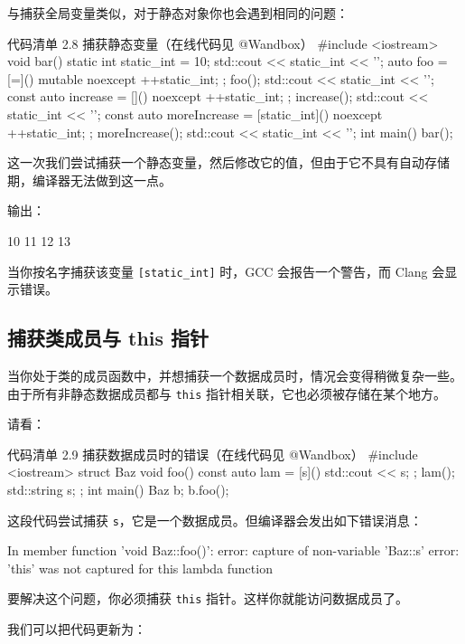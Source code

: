 \begin{codebox}
与捕获全局变量类似，对于静态对象你也会遇到相同的问题：

\begin{codeboxt}{代码清单 2.8 捕获静态变量（在线代码见 @Wandbox）}
#include <iostream>
void bar() {
static int static_int = 10;
std::cout << static_int << '\n';
auto foo = [=]() mutable noexcept{ ++static_int; };
foo();
std::cout << static_int << '\n';
const auto increase = []() noexcept { ++static_int; };
increase();
std::cout << static_int << '\n';
const auto moreIncrease = [static_int]() noexcept { ++static_int; };
moreIncrease();
std::cout << static_int << '\n';
}
int main() {
bar();
}
\end{codeboxt}

这一次我们尝试捕获一个静态变量，然后修改它的值，但由于它不具有自动存储期，编译器无法做到这一点。

输出：

\begin{codebox}
10
11
12
13
\end{codebox}

当你按名字捕获该变量 \texttt{[static\_int]} 时，GCC 会报告一个警告，而 Clang 会显示错误。

\subsection{捕获类成员与 this 指针}

当你处于类的成员函数中，并想捕获一个数据成员时，情况会变得稍微复杂一些。由于所有非静态数据成员都与 \texttt{this} 指针相关联，它也必须被存储在某个地方。

请看：

\begin{codeboxt}{代码清单 2.9 捕获数据成员时的错误（在线代码见 @Wandbox）}
#include <iostream>
struct Baz {
void foo() {
const auto lam = [s]() { std::cout << s; };
lam();
}
std::string s;
};
int main() {
Baz b;
b.foo();
}
\end{codeboxt}

这段代码尝试捕获 \texttt{s}，它是一个数据成员。但编译器会发出如下错误消息：

\begin{codebox}
In member function 'void Baz::foo()':
error: capture of non-variable 'Baz::s'
error: 'this' was not captured for this lambda function
\end{codebox}

要解决这个问题，你必须捕获 \texttt{this} 指针。这样你就能访问数据成员了。

我们可以把代码更新为：


\end{codebox}
